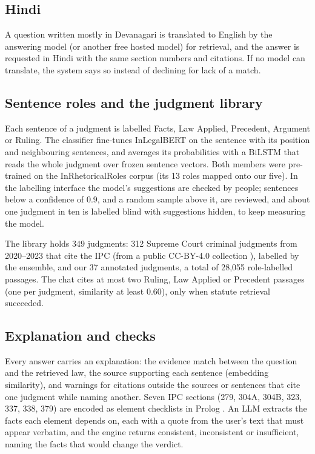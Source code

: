 \documentclass[conference]{IEEEtran}
\begin{document}
\subsection{Hindi}

A question written mostly in Devanagari is translated to English by the answering model (or another
free hosted model) for retrieval, and the answer is requested in Hindi with the same section numbers
and citations. If no model can translate, the system says so instead of declining for lack of a
match.

\subsection{Sentence roles and the judgment library}

Each sentence of a judgment is labelled Facts, Law Applied, Precedent, Argument or Ruling. The
classifier fine-tunes InLegalBERT \cite{paul2023inlegalbert} on the sentence with its position and
neighbouring sentences, and averages its probabilities with a BiLSTM \cite{hochreiter1997lstm} that
reads the whole judgment over frozen sentence vectors. Both members were pre-trained on the
InRhetoricalRoles corpus \cite{kalamkar2022corpus} (its 13 roles mapped onto our five). In the
labelling interface the model's suggestions are checked by people; sentences below a confidence of
0.9, and a random sample above it, are reviewed, and about one judgment in ten is labelled blind with
suggestions hidden, to keep measuring the model.

The library holds 349 judgments: 312 Supreme Court criminal judgments from 2020--2023 that cite the
IPC (from a public CC-BY-4.0 collection \cite{scjudgments}), labelled by the ensemble, and our 37
annotated judgments, a total of 28,055 role-labelled passages. The chat cites at most two Ruling, Law
Applied or Precedent passages (one per judgment, similarity at least 0.60), only when statute
retrieval succeeded.

\subsection{Explanation and checks}

Every answer carries an explanation: the evidence match between the question and the retrieved law,
the source supporting each sentence (embedding similarity), and warnings for citations outside the
sources or sentences that cite one judgment while naming another. Seven IPC sections (279, 304A,
304B, 323, 337, 338, 379) are encoded as element checklists in Prolog \cite{wielemaker2012swi}. An
LLM extracts the facts each element depends on, each with a quote from the user's text that must
appear verbatim, and the engine returns consistent, inconsistent or insufficient, naming the facts
that would change the verdict.
\end{document}
